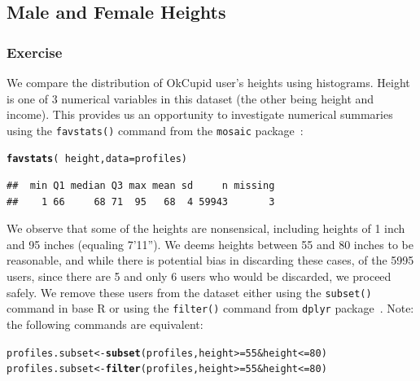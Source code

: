 \documentclass{article}\usepackage[]{graphicx}\usepackage[]{color}
\makeatletter
\newcommand{\hlnum}[1]{\textcolor[rgb]{0.686,0.059,0.569}{#1}}%
\newcommand{\hlopt}[1]{\textcolor[rgb]{0,0,0}{#1}}%
\newcommand{\hlstd}[1]{\textcolor[rgb]{0.345,0.345,0.345}{#1}}%
\newcommand{\hlkwb}[1]{\textcolor[rgb]{0.69,0.353,0.396}{#1}}%
\newcommand{\hlkwc}[1]{\textcolor[rgb]{0.333,0.667,0.333}{#1}}%
\newcommand{\hlkwd}[1]{\textcolor[rgb]{0.737,0.353,0.396}{\textbf{#1}}}%
\newenvironment{kframe}{%
 \def\at@end@of@kframe{}%
 \ifinner\ifhmode%
  \def\at@end@of@kframe{\end{minipage}}%
  \begin{minipage}{\columnwidth}%
 \fi\fi%
 \def\FrameCommand##1{\hskip\@totalleftmargin \hskip-\fboxsep
 \colorbox{shadecolor}{##1}\hskip-\fboxsep
     \hskip-\linewidth \hskip-\@totalleftmargin \hskip\columnwidth}%
 \MakeFramed {\advance\hsize-\width
   \@totalleftmargin\z@ \linewidth\hsize
   \@setminipage}}%
 {\par\unskip\endMakeFramed%
 \at@end@of@kframe}
\newenvironment{knitrout}{}{} %
\makeatother
\begin{document}
\subsection{Male and Female Heights}\label{section_height}
\subsubsection{Exercise}
We compare the distribution of OkCupid user's heights using histograms.  Height is one of 3 numerical variables in this dataset (the other being height and income).  This provides us an opportunity to investigate numerical summaries using the \verb#favstats()# command from the \verb#mosaic# package~\cite{mosaic}:

\begin{center}
\begin{knitrout}
\color{fgcolor}\begin{kframe}
\begin{alltt}
\hlkwd{favstats}\hlstd{(}\hlopt{~}\hlstd{height,} \hlkwc{data}\hlstd{=profiles)}
\end{alltt}
\begin{verbatim}
##  min Q1 median Q3 max mean sd     n missing
##    1 66     68 71  95   68  4 59943       3
\end{verbatim}
\end{kframe}
\end{knitrout}
\end{center}

We observe that some of the heights are nonsensical, including heights of 1 inch and 95 inches (equaling 7'11'').  We deems heights between 55 and 80 inches to be reasonable, and while there is potential bias in discarding these cases, of the 5995 users, since there are 5 and only 6 users who would be discarded, we proceed safely.  We remove these users from the dataset either using the \verb#subset()# command in base R or using the \verb#filter()# command from \verb#dplyr# package~\cite{dplyr}. Note: the following commands are equivalent: 

\begin{knitrout}
\color{fgcolor}\begin{kframe}
\begin{alltt}
\hlstd{profiles.subset} \hlkwb{<-} \hlkwd{subset}\hlstd{(profiles, height}\hlopt{>=}\hlnum{55} \hlopt{&} \hlstd{height} \hlopt{<=}\hlnum{80}\hlstd{)}
\hlstd{profiles.subset} \hlkwb{<-} \hlkwd{filter}\hlstd{(profiles, height}\hlopt{>=}\hlnum{55} \hlopt{&} \hlstd{height} \hlopt{<=}\hlnum{80}\hlstd{)}
\end{alltt}
\end{kframe}
\end{knitrout}
\end{document}
